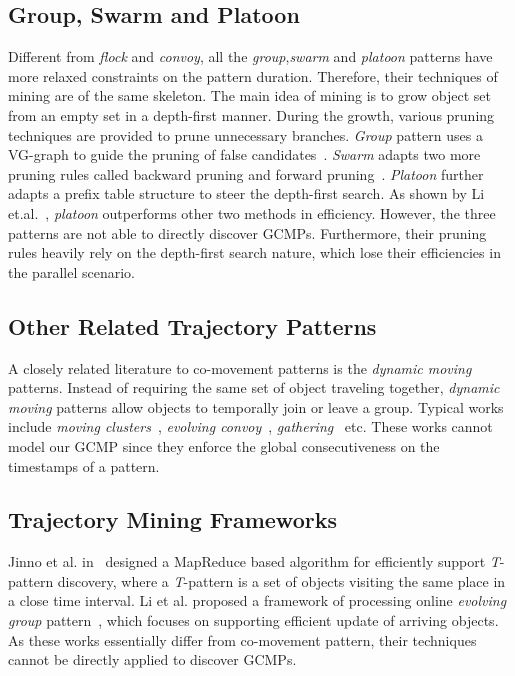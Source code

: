 \subsection{Group, Swarm and Platoon}
Different from \emph{flock} and \emph{convoy}, all the \emph{group},\emph{swarm} and \emph{platoon}
patterns have more relaxed constraints on the pattern duration. Therefore, their techniques of mining are of
the same skeleton. The main idea of mining is to grow object set from an empty set
in a depth-first manner. During the growth, various pruning techniques are provided to prune 
unnecessary branches. \emph{Group} pattern uses a VG-graph to guide the pruning of false candidates~\cite{wang2006grouppattern}.
\emph{Swarm} adapts two more pruning rules called backward pruning and forward pruning~\cite{li2010swarm}. \emph{Platoon}
further adapts a prefix table structure to steer the depth-first search. As shown by Li et.al.~\cite{li2015platoon},
\emph{platoon} outperforms other two methods in efficiency. 
However, the three patterns are not able to directly discover GCMPs.
Furthermore, their pruning rules heavily rely on the depth-first search nature, which lose their efficiencies
in the parallel scenario.

\subsection{Other Related Trajectory Patterns}
A closely related literature to co-movement patterns is the \emph{dynamic moving} patterns. Instead of requiring the same set of object traveling together, \emph{dynamic moving} patterns allow objects to temporally join or leave a group. Typical works include \emph{moving clusters}~\cite{kalnis2005movingclusters}, \emph{evolving convoy}~\cite{aung2010discovery}, \emph{gathering}~\cite{zheng2013gathering} etc. These works cannot model our GCMP since they enforce the global consecutiveness on the timestamps of a pattern. 

\subsection{Trajectory Mining Frameworks}
Jinno et al. in~\cite{jinno2012paralleltpattern} designed a MapReduce based algorithm for efficiently support \emph{T}-pattern discovery, where a \emph{T}-pattern is a set of objects visiting the same place in a close time interval. Li et al. proposed a framework of processing online \emph{evolving group} pattern~\cite{li2013onlinegroup}, which focuses on supporting efficient update of arriving objects. 
As these works essentially differ from co-movement pattern, their techniques cannot be directly applied to discover GCMPs.
